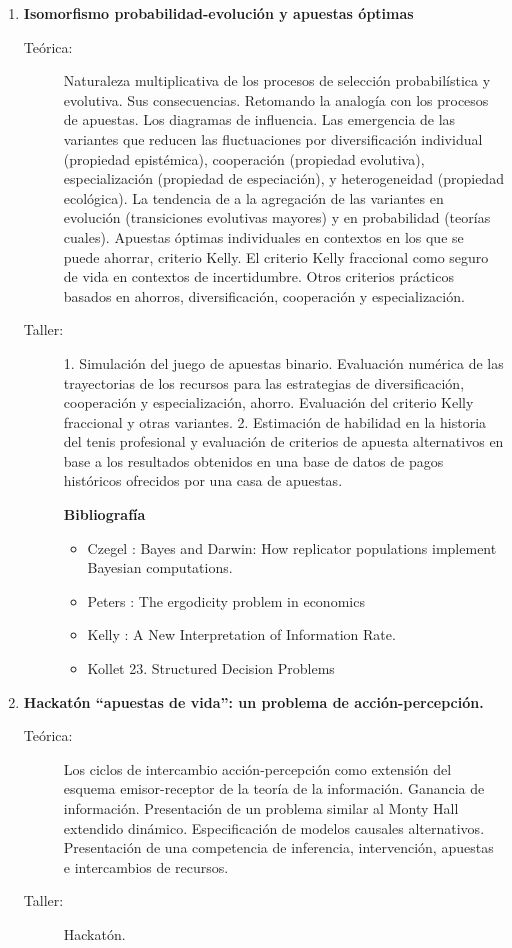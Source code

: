 \documentclass[10pt]{article}
\begin{document}
\begin{enumerate}
\item \textbf{Isomorfismo probabilidad-evolución y apuestas óptimas}
\vspace{-0.15cm}
\begin{description}
\item[Teórica:]
Naturaleza multiplicativa de los procesos de selección probabilística y evolutiva.
Sus consecuencias.
Retomando la analogía con los procesos de apuestas.
Los diagramas de influencia.
Las emergencia de las variantes que reducen las fluctuaciones por diversificación individual (propiedad epistémica), cooperación (propiedad evolutiva), especialización (propiedad de especiación), y heterogeneidad (propiedad ecológica).
La tendencia de a la agregación de las variantes en evolución (transiciones evolutivas mayores) y en probabilidad (teorías cuales).
Apuestas óptimas individuales en contextos en los que se puede ahorrar, criterio Kelly.
El criterio Kelly fraccional como seguro de vida en contextos de incertidumbre.
Otros criterios prácticos basados en ahorros, diversificación, cooperación y especialización.
\item[Taller:]
1. Simulación del juego de apuestas binario.
Evaluación numérica de las trayectorias de los recursos para las estrategias de diversificación, cooperación y especialización, ahorro.
Evaluación del criterio Kelly fraccional y otras variantes.
2. Estimación de habilidad en la historia del tenis profesional y evaluación de criterios de apuesta alternativos en base a los resultados obtenidos en una base de datos de pagos históricos ofrecidos por una casa de apuestas.
\item[] \textbf{Bibliografía}
\begin{itemize}
\item Czegel \cite{czegel2022-bayesDarwin}: Bayes and Darwin: How replicator populations implement Bayesian computations.
\item Peters \cite{peters2019-ergodicityEconomics}: The ergodicity problem in economics
\item Kelly \cite{kelly1956-informationRate}: A New Interpretation of Information Rate.
\item Kollet \cite{koller2009-PGM} 23. Structured Decision Problems
\end{itemize}
\end{description}

\item \textbf{Hackatón ``apuestas de vida'': un problema de acción-percepción.}
\vspace{-0.15cm}
\begin{description}
\item[Teórica:]
Los ciclos de intercambio acción-percepción como extensión del esquema emisor-receptor de la teoría de la información.
Ganancia de información.
Presentación de un problema similar al Monty Hall extendido dinámico.
Especificación de modelos causales alternativos.
Presentación de una competencia de inferencia, intervención, apuestas e intercambios de recursos.
\item[Taller:] Hackatón.
\end{description}


\end{enumerate}
\end{document}
